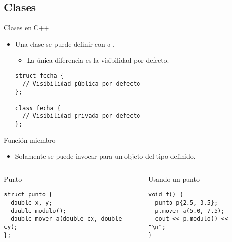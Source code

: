 \subsection{Clases}

\begin{frame}[t,fragile]{Clases en C++}
\begin{itemize}
  \item Una clase se puede definir con  o .
    \begin{itemize}
      \item La única diferencia es la visibilidad por defecto.
    \end{itemize}
\begin{lstlisting}
struct fecha {
  // Visibilidad pública por defecto
};

class fecha {
  // Visibilidad privada por defecto
};
\end{lstlisting}
\end{itemize}
\end{frame}

\begin{frame}[t,fragile]{Función miembro}
\begin{itemize}
  \item Solamente se puede invocar para un objeto del tipo definido.
\end{itemize}

\begin{columns}[T]

\begin{block}{Punto}
\begin{lstlisting}
struct punto {
  double x, y;
  double modulo();
  double mover_a(double cx, double cy);
};
\end{lstlisting}
\end{block}

\begin{block}{Usando un punto}
\begin{lstlisting}
void f() {
  punto p{2.5, 3.5};
  p.mover_a(5.0, 7.5);
  cout << p.modulo() << "\n";
}
\end{lstlisting}
\end{block}
\end{columns}

\end{frame}

